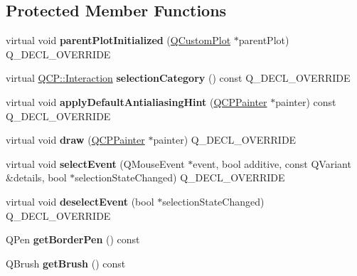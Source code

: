 \subsection*{Protected Member Functions}
\begin{DoxyCompactItemize}
\item 
\mbox{\label{class_q_c_p_legend_a2b225cefb5eb267771e2c7c44fd2b408}} 
virtual void {\bfseries parent\+Plot\+Initialized} (\hyperlink{class_q_custom_plot}{Q\+Custom\+Plot} $\ast$parent\+Plot) Q\+\_\+\+D\+E\+C\+L\+\_\+\+O\+V\+E\+R\+R\+I\+DE
\item 
\mbox{\label{class_q_c_p_legend_a1a2075e462984f9ff51d9c75bda3581b}} 
virtual \hyperlink{namespace_q_c_p_a2ad6bb6281c7c2d593d4277b44c2b037}{Q\+C\+P\+::\+Interaction} {\bfseries selection\+Category} () const Q\+\_\+\+D\+E\+C\+L\+\_\+\+O\+V\+E\+R\+R\+I\+DE
\item 
\mbox{\label{class_q_c_p_legend_a817f75c234f82a2e26643dc0de742095}} 
virtual void {\bfseries apply\+Default\+Antialiasing\+Hint} (\hyperlink{class_q_c_p_painter}{Q\+C\+P\+Painter} $\ast$painter) const Q\+\_\+\+D\+E\+C\+L\+\_\+\+O\+V\+E\+R\+R\+I\+DE
\item 
\mbox{\label{class_q_c_p_legend_a74f93358d2b4a76ec95c3a5d825582a3}} 
virtual void {\bfseries draw} (\hyperlink{class_q_c_p_painter}{Q\+C\+P\+Painter} $\ast$painter) Q\+\_\+\+D\+E\+C\+L\+\_\+\+O\+V\+E\+R\+R\+I\+DE
\item 
\mbox{\label{class_q_c_p_legend_a71f54a05c3e5b1a1ade1864422cd642e}} 
virtual void {\bfseries select\+Event} (Q\+Mouse\+Event $\ast$event, bool additive, const Q\+Variant \&details, bool $\ast$selection\+State\+Changed) Q\+\_\+\+D\+E\+C\+L\+\_\+\+O\+V\+E\+R\+R\+I\+DE
\item 
\mbox{\label{class_q_c_p_legend_ac2066837f7ebc32a5b15434cdca5b176}} 
virtual void {\bfseries deselect\+Event} (bool $\ast$selection\+State\+Changed) Q\+\_\+\+D\+E\+C\+L\+\_\+\+O\+V\+E\+R\+R\+I\+DE
\item 
\mbox{\label{class_q_c_p_legend_a1cf9df6f2130c5ad842dc92188ab6bd7}} 
Q\+Pen {\bfseries get\+Border\+Pen} () const
\item 
\mbox{\label{class_q_c_p_legend_ab1438d5d67304cdda3b9339da580d6bc}} 
Q\+Brush {\bfseries get\+Brush} () const
\end{DoxyCompactItemize}
